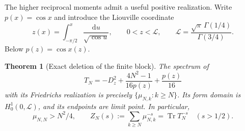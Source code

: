 \documentclass[10pt]{article}
\newtheorem{theorem}{Theorem}
\newcommand{\dd}{\mathrm d}
\begin{document}
The higher reciprocal moments admit a useful positive realization.
Write $p(x)=\cos x$ and introduce the Liouville coordinate
\[
z(x)=\int_{-\pi/2}^x\frac{\dd u}{\sqrt{\cos u}},\qquad
0<z<\mathcal L,\qquad
\mathcal L=\frac{\sqrt\pi\,\Gamma(1/4)}{\Gamma(3/4)}.
\]
Below $p(z)=\cos x(z)$.
\begin{theorem}[Exact deletion of the finite block]
The spectrum of
\begin{equation}
\boxed{\quad T_N=-D_z^2+
\frac{4N^2-1}{16p(z)}+\frac{p(z)}{16}\quad}
\label{eq:positivepartner}
\end{equation}
with its Friedrichs realization is precisely
$\{\mu_{N,k}:k\ge N\}$. Its form domain is $H_0^1(0,\mathcal L)$,
and its endpoints are limit point. In particular,
\begin{equation}
\mu_{N,N}>N^2/4,\qquad
Z_N(s):=\sum_{k\ge N}\mu_{N,k}^{-s}
=\operatorname{Tr}T_N^{-s}\quad(s>1/2).
\label{eq:highertrace}
\end{equation}
\end{theorem}
\end{document}
